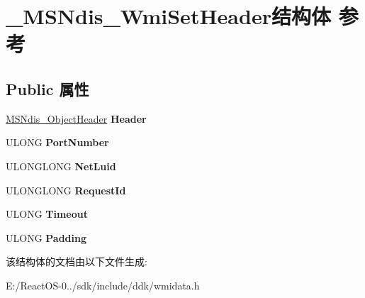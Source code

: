 \hypertarget{struct___m_s_ndis___wmi_set_header}{}\section{\+\_\+\+M\+S\+Ndis\+\_\+\+Wmi\+Set\+Header结构体 参考}
\label{struct___m_s_ndis___wmi_set_header}
\subsection*{Public 属性}
\begin{DoxyCompactItemize}
\item 
\mbox{\label{struct___m_s_ndis___wmi_set_header_adad043ce73e8d4d7bdc911c23095aba9}} 
\hyperlink{struct___m_s_ndis___object_header}{M\+S\+Ndis\+\_\+\+Object\+Header} {\bfseries Header}
\item 
\mbox{\label{struct___m_s_ndis___wmi_set_header_ae547b5f9f486ac743bae98f324472784}} 
U\+L\+O\+NG {\bfseries Port\+Number}
\item 
\mbox{\label{struct___m_s_ndis___wmi_set_header_ad8b2b2eb8839313a0f82d81c31b0c12e}} 
U\+L\+O\+N\+G\+L\+O\+NG {\bfseries Net\+Luid}
\item 
\mbox{\label{struct___m_s_ndis___wmi_set_header_a21045e02557b69a5016c6e09fe513c0e}} 
U\+L\+O\+N\+G\+L\+O\+NG {\bfseries Request\+Id}
\item 
\mbox{\label{struct___m_s_ndis___wmi_set_header_a963b8c159dc8bd50dfc52a2d693d2f4d}} 
U\+L\+O\+NG {\bfseries Timeout}
\item 
\mbox{\label{struct___m_s_ndis___wmi_set_header_a5b910b7b24dffd74e83d2b80b4f452c8}} 
U\+L\+O\+NG {\bfseries Padding}
\end{DoxyCompactItemize}


该结构体的文档由以下文件生成\+:\begin{DoxyCompactItemize}
\item 
E\+:/\+React\+O\+S-\/0../sdk/include/ddk/wmidata.\+h\end{DoxyCompactItemize}
